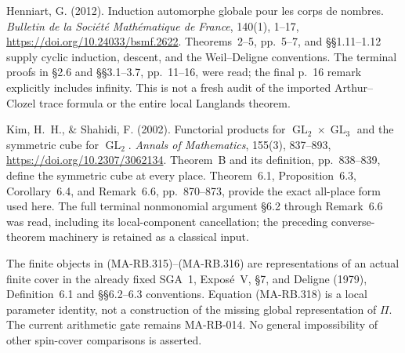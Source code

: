 Henniart, G. (2012). Induction automorphe globale pour
les corps de nombres. \emph{Bulletin de la Soci\'et\'e
Math\'ematique de France}, 140(1), 1--17,
\url{https://doi.org/10.24033/bsmf.2622}.
Theorems~2--5, pp.~5--7,
and \S\S1.11--1.12 supply cyclic induction, descent,
and the Weil--Deligne conventions. The terminal proofs
in \S2.6 and \S\S3.1--3.7, pp.~11--16, were read;
the final p.~16 remark explicitly includes infinity.
This is not a fresh audit of the imported Arthur--Clozel
trace formula or the entire local Langlands theorem.

Kim, H.~H., \& Shahidi, F. (2002). Functorial products
for \(\operatorname{GL}_2\times\operatorname{GL}_3\)
and the symmetric cube for \(\operatorname{GL}_2\).
\emph{Annals of Mathematics}, 155(3), 837--893,
\url{https://doi.org/10.2307/3062134}.
Theorem~B and its definition, pp.~838--839,
define the symmetric cube at every place. Theorem~6.1,
Proposition~6.3, Corollary~6.4, and Remark~6.6,
pp.~870--873, provide the exact all-place form used here.
The full terminal nonmonomial argument \S6.2 through
Remark~6.6 was read, including its local-component
cancellation; the preceding converse-theorem machinery
is retained as a classical input.

The finite objects in (MA-RB.315)--(MA-RB.316) are
representations of an actual finite cover in the already
fixed SGA~1, Expos\'e~V, \S7, and Deligne (1979),
Definition~6.1 and \S\S6.2--6.3 conventions. Equation
(MA-RB.318) is a local parameter identity, not a construction
of the missing global representation of \(\Pi\).
The current arithmetic gate remains MA-RB-014. No general
impossibility of other spin-cover comparisons is asserted.

